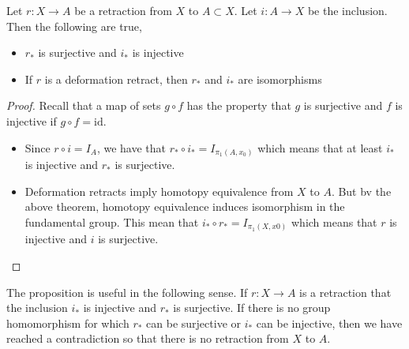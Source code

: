 \documentclass[a4paper]{article}
\begin{document}
\begin{prp}{}{} Let $r:X\to A$ be a retraction from $X$ to $A\subset X$. Let $i:A\to X$ be the inclusion. Then the following are true, 
\begin{itemize}
\item $r_\ast$ is surjective and $i_\ast$ is injective
\item If $r$ is a deformation retract, then $r_\ast$ and $i_\ast$ are isomorphisms
\end{itemize} 
\begin{proof}
Recall that a map of sets $g\circ f$ has the property that $g$ is surjective and $f$ is injective if $g\circ f=\text{id}$. 
\begin{itemize}
\item Since $r\circ i=I_A$, we have that $r_\ast\circ i_\ast=I_{\pi_1(A,x_0)}$ which means that at least $i_\ast$ is injective and $r_\ast$ is surjective. 
\item Deformation retracts imply homotopy equivalence from $X$ to $A$. But bv the above theorem, homotopy equivalence induces isomorphism in the fundamental group. This mean that $i_\ast\circ r_\ast=I_{\pi_1(X,x0)}$ which means that $r$ is injective and $i$ is surjective. 
\end{itemize}
\end{proof}
\end{prp}

The proposition is useful in the following sense. If $r:X\to A$ is a retraction that the inclusion $i_\ast$ is injective and $r_\ast$ is surjective. If there is no group homomorphism for which $r_\ast$ can be surjective or $i_\ast$ can be injective, then we have reached a contradiction so that there is no retraction from $X$ to $A$.  
\end{document}
